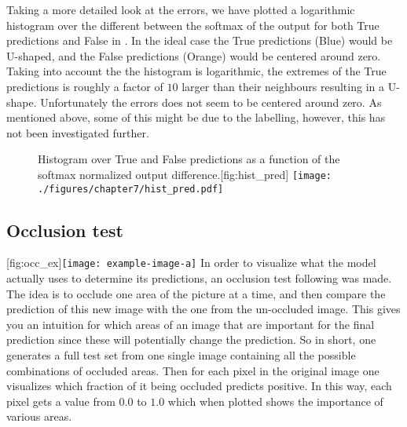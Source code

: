 Taking a more detailed look at the errors, we have plotted a logarithmic histogram over the different between the softmax of the output for both True predictions and False in .
In the ideal case the True predictions (Blue) would be U-shaped, and the False predictions (Orange) would be centered around zero.  Taking into account the the histogram is logarithmic, the extremes of the True predictions is roughly a factor of $10$ larger than their neighbours resulting in a U-shape. Unfortunately the errors does not seem to be centered around zero. As mentioned above, some of this might be due to the labelling, however, this has not been investigated further.

\begin{figure}[h]
	\begin{sidecaption}{Histogram over True and False predictions as a function of the softmax normalized output difference.}[fig:hist_pred]
		\antimpjustification
		\centering
		\texttt{[image: ./figures/chapter7/hist\_pred.pdf]}
	\end{sidecaption}
\end{figure}

\subsection{Occlusion test}
[fig:occ_ex]{\texttt{[image: example-image-a]}}
In order to visualize what the model actually uses to determine its predictions, an occlusion test following \cite{zeilerVisualizingUnderstandingConvolutional2013} was made.
The idea is to occlude one area of the picture at a time, and then compare the prediction of this new image with the one from the un-occluded image.
This gives you an intuition for which areas of an image that are important for the final prediction since these will potentially change the prediction. 
So in short, one generates a full test set from one single image containing all the possible combinations of occluded areas. Then for each pixel in the original image one visualizes which fraction of it being occluded predicts positive. 
In this way, each pixel gets a value from $0.0$ to $1.0$ which when plotted shows the importance of various areas.

